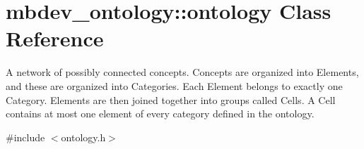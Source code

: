 \hypertarget{classmbdev__ontology_1_1ontology}{\section{mbdev\-\_\-ontology\-:\-:ontology \-Class \-Reference}
\label{classmbdev__ontology_1_1ontology}
}


\-A network of possibly connected concepts. \-Concepts are organized into \-Elements, and these are organized into \-Categories. \-Each \-Element belongs to exactly one \-Category. \-Elements are then joined together into groups called \-Cells. \-A \-Cell contains at most one element of every category defined in the ontology.  




{\ttfamily \#include $<$ontology.\-h$>$}

